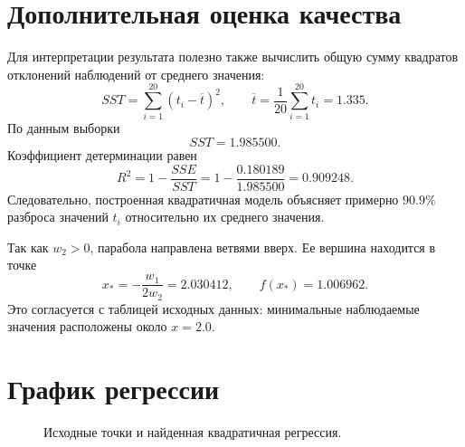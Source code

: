 \documentclass[12pt,a4paper]{article}
\begin{document}
\section*{Дополнительная оценка качества}
Для интерпретации результата полезно также вычислить общую сумму квадратов
отклонений наблюдений от среднего значения:
\[
    SST=\sum_{i=1}^{20}(t_i-\overline{t})^2,
    \qquad
    \overline{t}=\frac{1}{20}\sum_{i=1}^{20}t_i=1.335.
\]
По данным выборки
\[
    SST=1.985500.
\]
Коэффициент детерминации равен
\[
    R^2=1-\frac{SSE}{SST}
       =1-\frac{0.180189}{1.985500}
       =0.909248.
\]
Следовательно, построенная квадратичная модель объясняет примерно $90.9\%$
разброса значений $t_i$ относительно их среднего значения.

Так как $w_2>0$, парабола направлена ветвями вверх. Ее вершина находится в
точке
\[
    x_*=-\frac{w_1}{2w_2}=2.030412,
    \qquad
    f(x_*)=1.006962.
\]
Это согласуется с таблицей исходных данных: минимальные наблюдаемые значения
расположены около $x=2.0$.

\section*{График регрессии}
\begin{figure}[H]
\centering
{}
\caption{Исходные точки и найденная квадратичная регрессия.}
\end{figure}
\end{document}
